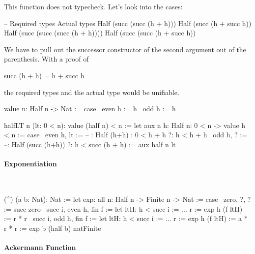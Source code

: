This function does not typecheck. Let's look into the cases:
\begin{alba}
    --  Required types                          Actual types
        Half (succ (succ (h + h)))              Half (succ (h + succ h))
        Half (succ (succ (succ (h + h))))       Half (succ (succ (h + succ h))
\end{alba}
We have to pull out the successor constructor of the second argument out of the
parenthesis. With a proof of
\begin{alba}
    succ (h + h) = h + succ h
\end{alba}
the required types and the actual type would be unifiable.

\begin{alba}
    value {n}: Half n -> Nat := case
        \ even h := h
        \ odd  h := h

    halfLT {n} (lt: 0 < n):  value (half n) < n :=
        let
            aux {n} {h: Half n}: 0 < n  ->  value h < n := case
                \ {even h},       lt :=
                -- : Half (h+h)   : 0 < h + h
                    ?: h < h + h
                \ {odd h},              ? :=
                --: Half (succ (h+h))
                    ?: h < succ (h + h)
        := aux {half n} lt
\end{alba}






\paragraph{Exponentiation}

\ \begin{alba}
    (^) (a b: Nat): Nat :=
        let
            exp: all n: Half n -> Finite n -> Nat := case
                \ zero, ?, ? :=
                    succ zero
                \ succ i, even h, fin f :=
                    let
                        ltH: h < succ i := ...
                        r := exp h (f ltH)
                    :=
                        r * r
                \ succ i, odd h, fin f :=
                    let
                        ltH: h < succ i := ...
                        r := exp h (f ltH)
                    :=
                        a * r * r
        :=
            exp b (half b) natFinite
\end{alba}




\paragraph{Ackermann Function}

